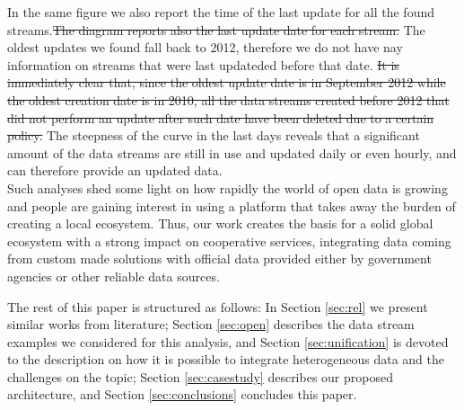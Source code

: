 In the same figure we also report the time of the last update for all the found streams.\st{The diagram reports also the last update date for each stream.}
The oldest updates we found fall back to 2012, therefore we do not have nay information on streams that were last updateded before that date.
\st{It is immediately clear that, since the oldest update date is in September 2012 while the oldest creation date is in 2010, all the data streams created before 2012 that did not perform an update after such date have been deleted due to a certain policy.}
The steepness of the curve in the last days reveals that a significant amount of the data streams are still in use and updated daily or even hourly, and can therefore provide an updated data.
\\

Such analyses shed some light on how rapidly the world of open data is growing and people are gaining interest in using a platform that takes away the burden of creating a local ecosystem.
Thus, our work creates the basis for a solid global ecosystem with a strong impact on cooperative services, integrating data coming from custom made solutions with official data provided either by government agencies or other reliable data sources. 

The rest of this paper is structured as follows: In Section \ref{sec:rel} we present similar works from literature; Section \ref{sec:open} describes the data stream examples we considered for this analysis, and Section \ref{sec:unification} is devoted to the description on how it is possible to integrate heterogeneous data and the challenges on the topic; Section \ref{sec:casestudy} describes our proposed architecture, and Section \ref{sec:conclusions} concludes this paper.